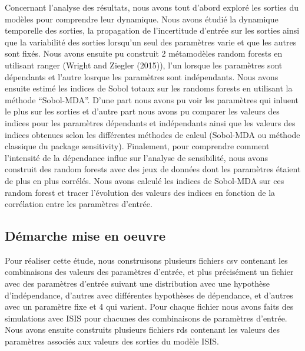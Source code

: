 \documentclass[
]{article}
\begin{document}
Concernant l'analyse des résultats, nous avons tout d'abord exploré les
sorties du modèles pour comprendre leur dynamique. Nous avons étudié la
dynamique temporelle des sorties, la propagation de l'incertitude
d'entrée sur les sorties ainsi que la variabilité des sorties lorsqu'un
seul des paramètres varie et que les autres sont fixés. Nous avons
ensuite pu construit 2 métamodèles random forests en utilisant ranger
(Wright and Ziegler (2015)), l'un lorsque les paramètres sont dépendants
et l'autre losrque les paramètres sont indépendants. Nous avons ensuite
estimé les indices de Sobol totaux sur les randoms forests en utilisant
la méthode ``Sobol-MDA''. D'une part nous avons pu voir les paramètres
qui inluent le plus sur les sorties et d'autre part nous avons pu
comparer les valeurs des indices pour les paramètres dépendants et
indépendants ainsi que les valeurs des indices obtenues selon les
différentes méthodes de calcul (Sobol-MDA ou méthode classique du
package sensitivity). Finalement, pour comprendre comment l'intensité de
la dépendance influe sur l'analyse de sensibilité, nous avons construit
des random forests avec des jeux de données dont les paramètres étaient
de plus en plus corrélés. Nous avons calculé les indices de Sobol-MDA
sur ces random forest et tracer l'évolution des valeurs des indices en
fonction de la corrélation entre les paramètres d'entrée.

\hypertarget{duxe9marche-mise-en-oeuvre}{%
\subsection{Démarche mise en oeuvre}\label{duxe9marche-mise-en-oeuvre}}

Pour réaliser cette étude, nous construisons plusieurs fichiers csv
contenant les combinaisons des valeurs des paramètres d'entrée, et plus
précisément un fichier avec des paramètres d'entrée suivant une
distribution avec une hypothèse d'indépendance, d'autres avec
différentes hypothèses de dépendance, et d'autres avec un paramètre fixe
et 4 qui varient. Pour chaque fichier nous avons faits des simulations
avec ISIS pour chacunes des combinaisons de paramètres d'entrée. Nous
avons ensuite construits plusieurs fichiers rds contenant les valeurs
des paramètres associés aux valeurs des sorties du modèle ISIS.
\end{document}
